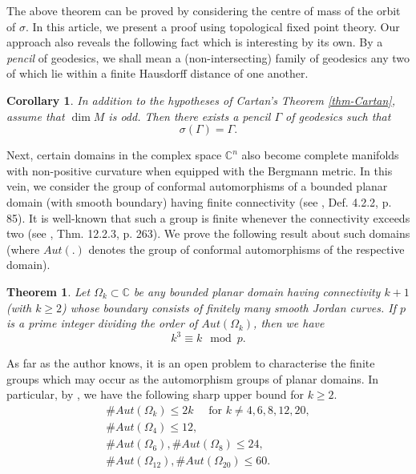\documentclass[12pt,a4paper]{article}
\newtheorem{theorem}{Theorem}[section]
\newtheorem{corollary}{Corollary}[section]
\begin{document}
    The above theorem can be proved by considering the centre of mass of the orbit of $\sigma$. In this article, we present a proof using topological fixed point theory. Our approach also reveals the following fact which is interesting by its own. By a \textit{pencil} of geodesics, we shall mean a (non-intersecting) family of geodesics any two of which lie within a finite Hausdorff distance of one another.
\begin{corollary}\label{cor-Cartan}
 In addition to the hypotheses of Cartan's Theorem \ref{thm-Cartan}, assume that $\dim M$ is odd. Then there exists a pencil $\Gamma$ of geodesics such that \begin{equation*}
                                                                                                                                                              \sigma(\Gamma)= \Gamma.
                                                                                                                                                             \end{equation*}

\end{corollary}
\indent

    Next, certain domains in the complex space $\mathbb{C}^{n}$ also become complete manifolds with non-positive curvature when equipped with the Bergmann metric. In this vein, we consider the group of conformal automorphisms of a bounded planar domain (with smooth boundary) having finite connectivity (see \cite{krantz}, Def. 4.2.2, p. 85). It is well-known that such a group is finite whenever the connectivity exceeds two (see \cite{krantz}, Thm. 12.2.3, p. 263). We prove the following result about such domains (where $Aut(.)$ denotes the group of conformal automorphisms of the respective domain).
\begin{theorem}\label{thm-auto}
 Let $\Omega_{k} \subset \mathbb{C}$ be any bounded planar domain having connectivity $k+1$ (with $k\geq 2$) whose boundary consists of finitely many smooth Jordan curves. If $p$ is a prime integer dividing the order of $Aut(\Omega_{k})$, then we have \begin{equation*}
         k^{3} \equiv k \mod p .                                                                                                                                                       \end{equation*}
\end{theorem}
\indent

     As far as the author knows, it is an open problem to characterise the finite groups which may occur as the automorphism groups of planar domains. In particular, by \cite{heins}, we have the following sharp upper bound for $k\geq 2$.
 \begin{align*}
 \#Aut(\Omega_{k}) \leq 2k  \quad \text{ for } k\not = 4,6,8,12,20,\\
 \#Aut(\Omega_{4}) \leq 12,\\
 \#Aut(\Omega_{6}),\#Aut(\Omega_{8}) \leq  24,\\
 \#Aut(\Omega_{12}),\#Aut(\Omega_{20}) \leq 60.
\end{align*}
\indent
\end{document}
